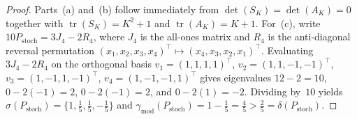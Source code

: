 \documentclass[11pt]{article}
\theoremstyle{definition}
\DeclareMathOperator{\tr}{tr}
\begin{document}
\begin{proof}
Parts~(a) and~(b) follow immediately from $\det(S_K) = \det(A_K) = 0$ together with $\tr(S_K) = K^2 + 1$ and $\tr(A_K) = K + 1$. For~(c), write $10 P_{\mathrm{stoch}} = 3 J_4 - 2 R_4$, where $J_4$ is the all-ones matrix and $R_4$ is the anti-diagonal reversal permutation $(x_1,x_2,x_3,x_4)^\top \mapsto (x_4,x_3,x_2,x_1)^\top$. Evaluating $3 J_4 - 2 R_4$ on the orthogonal basis $v_1 = (1,1,1,1)^\top$, $v_2 = (1,1,-1,-1)^\top$, $v_3 = (1,-1,1,-1)^\top$, $v_4 = (1,-1,-1,1)^\top$ gives eigenvalues $12 - 2 = 10$, $0 - 2(-1) = 2$, $0 - 2(-1) = 2$, and $0 - 2(1) = -2$. Dividing by~$10$ yields $\sigma(P_{\mathrm{stoch}}) = \{1, \tfrac{1}{5}, \tfrac{1}{5}, -\tfrac{1}{5}\}$ and $\gamma_{\mathrm{mod}}(P_{\mathrm{stoch}}) = 1 - \tfrac{1}{5} = \tfrac{4}{5} > \tfrac{2}{5} = \delta(P_{\mathrm{stoch}})$.
\end{proof}
\end{document}
